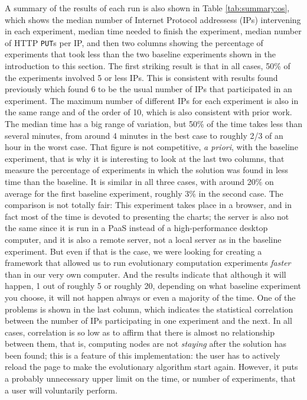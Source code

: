 \documentclass[journal,onecolumn]{IEEEtran}
\begin{document}
A summary of the results of each run is also shown in Table
\ref{tab:summary:os}, which shows the median number of Internet Protocol addressess (IPs)
intervening in each experiment,  median time needed
to finish the experiment, median number of HTTP {\tt PUT}s per IP, and
then two columns showing the percentage of experiments that took less
than the two baseline experiments shown in the introduction to this
section. The first striking result is that in all cases, 50\% of the
experiments involved 5 or less IPs. This is consistent with results
found previously \cite{DBLP:conf/gecco/GuervosG15} which found 6 to be
the usual number of IPs that participated in an experiment. The
maximum number of different IPs for each experiment is also in the
same range and of the order of 10, which is also consistent with
prior work. The median time has a big range of variation, but 50\% of
the time takes less than several minutes, from around 4 minutes in the
best case to roughly 2/3 of an hour in the worst case. That figure is
not competitive, {\em a priori}, with the baseline experiment, that is
why it is interesting to look at the last two columns, that measure
the percentage of experiments in which the solution was found in less
time than the baseline. It is similar in all three cases, with around
20\% on average for the first baseline experiment, roughly 3\% in the
second case. The comparison is not totally fair: This experiment takes
place in a browser, and in fact most of the time is devoted to
presenting the charts; the server is also not the same since it is run in a
PaaS instead of a high-performance desktop computer, and it is also a
remote server, not a local server as in the baseline experiment. But
even if that is the case, we were looking for creating a framework that
allowed us to run evolutionary computation experiments {\em faster} than
in our very own computer. And the results indicate that although it will
happen, 1 out of roughly 5 or roughly 20, depending on what baseline
experiment you choose, it will not happen always or even a majority of
the time. One of the problems is shown in the last column, which
indicates the statistical correlation between the number of IPs
participating in one experiment and the next. In all cases,
correlation is so low as to affirm that there is almost no
relationship between them, that is, computing nodes are not {\em
  staying} after the solution has been found; this is a feature of
this implementation: the user has to actively reload the page to make
the evolutionary algorithm start again. However, it puts a probably
unnecessary upper limit on the time, or number of experiments, that a user
will voluntarily perform.
\end{document}
